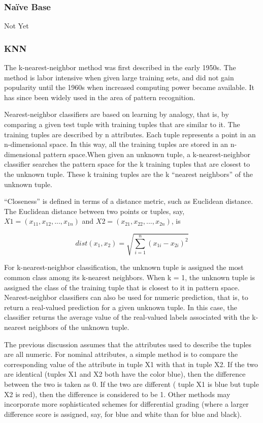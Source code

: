\documentclass[12pt,fleqn]{book} %
\begin{document}
\subsubsection{Naïve Base}
Not Yet \bigskip

\subsubsection{KNN}
The k-nearest-neighbor method \cite{classifications} was first described in the early 1950s. The method is labor intensive when given large training sets, and did not gain popularity until the 1960s when increased computing power became available. It has since been widely used in the area of pattern recognition. \bigskip

Nearest-neighbor classifiers are based on learning by analogy, that is, by comparing a given test tuple with training tuples that are similar to it. The training tuples are described by n attributes. Each tuple represents a point in an n-dimensional space. In this way, all the training tuples are stored in an n-dimensional pattern space.When given an unknown tuple, a k-nearest-neighbor classifier searches the pattern space for the k training tuples that are closest to the unknown tuple. These k training tuples are the k “nearest neighbors” of the unknown tuple.
\bigskip

“Closeness” is defined in terms of a distance metric, such as Euclidean distance. The
Euclidean distance between two points or tuples, say, $X1 =( x_{11}, x_{12},..., x_{1n})$ and $X2=(x_{21}, x_{22},..., x_{2n})$, is

\begin{dBox}
\begin{equation}
dist(x_1, x_2) = \sqrt{\sum_{i=1}^{n}(x_{1i}-x_{2i})^2}
\end{equation}
\end{dBox}


For k-nearest-neighbor classification, the unknown tuple is assigned the most common class among its k-nearest neighbors. When k = 1, the unknown tuple is assigned the class of the training tuple that is closest to it in pattern space. Nearest-neighbor classifiers can also be used for numeric prediction, that is, to return a real-valued prediction
for a given unknown tuple. In this case, the classifier returns the average value of the real-valued labels associated with the k-nearest neighbors of the unknown tuple.\bigskip

The previous discussion assumes that the attributes used
to describe the tuples are all numeric. For nominal attributes, a simple method is to compare the corresponding value of the attribute in tuple X1 with that in tuple X2. If
the two are identical (tuples X1 and X2 both have the color blue), then the difference between the two is taken as 0. If the two are different ( tuple X1 is blue but tuple X2 is red), then the difference is considered to be 1. Other methods may incorporate more sophisticated schemes for differential grading (where a larger difference score is assigned, say, for blue and white than for blue and black).\bigskip
\end{document}
